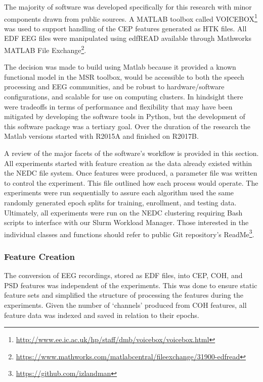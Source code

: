 The majority of software was developed specifically for this research with minor components drawn from public sources. A MATLAB toolbox called VOICEBOX\footnote{\url{http://www.ee.ic.ac.uk/hp/staff/dmb/voicebox/voicebox.html}} was used to support handling of the \ac{CEP} features generated as \ac{HTK} files. All \ac{EDF} \ac{EEG} files were manipulated using edfREAD available through Mathworks MATLAB File Exchange\footnote{\url{https://www.mathworks.com/matlabcentral/fileexchange/31900-edfread}}.

The decision was made to build using Matlab because it provided a known functional model in the \ac{MSR} toolbox, would be accessible to both the speech processing and \ac{EEG} communities, and be robust to hardware/software configurations, and scalable for use on computing clusters. In hindsight there were tradeoffs in terms of performance and flexibility that may have been mitigated by developing the software tools in Python, but the development of this software package was a tertiary goal. Over the duration of the research the Matlab versions started with R2015A and finished on R2017B.

A review of the major facets of the software's workflow is provided in this section. All experiments started with feature creation as the data already existed within the \ac{NEDC} file system. Once features were produced, a parameter file was written to control the experiment. This file outlined how each process would operate. The experiments were run sequentially to assure each algorithm used the same randomly generated epoch splits for training, enrollment, and testing data. Ultimately, all experiments were run on the \ac{NEDC} clustering requiring Bash scripts to interface with our Slurm Workload Manager. Those interested in the individual classes and functions should refer to public Git repository's ReadMe\footnote{\url{https://github.com/izlandman}}. 

\subsubsection{Feature Creation}

The conversion of \ac{EEG} recordings, stored as \ac{EDF} files, into \ac{CEP}, \ac{COH}, and \ac{PSD} features was independent of the experiments. This was done to ensure static feature sets and simplified the structure of processing the features during the experiments. Given the number of `channels' produced from \ac{COH} features, all feature data was indexed and saved in relation to their epochs.

